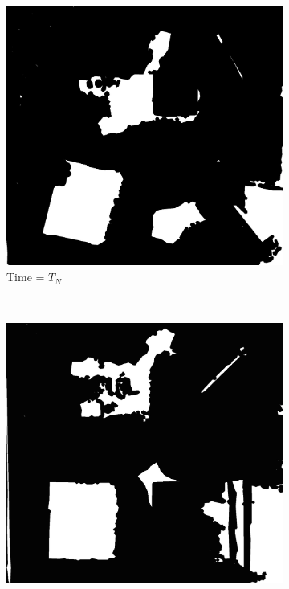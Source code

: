 \documentclass[twocolumn,10pt]{asme2e}
\begin{document}
\begin{figure}
        \centering
        \begin{subfigure}[b]{0.15\textwidth}
                \includegraphics[width=\textwidth]{processed2}
                \caption{Time = $T_{N}$}
                \label{fig:latest image}
        \end{subfigure}%
        ~ %
        \begin{subfigure}[b]{0.15\textwidth}
                \includegraphics[width=\textwidth]{processed4}

\end{subfigure}
\end{figure}
\end{document}
